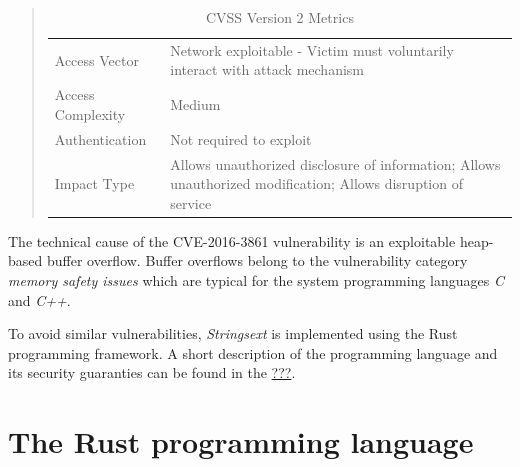 \begin{quote}
\begin{longtable}[]{@{}ll@{}}
\caption{CVSS Version 2 Metrics}\tabularnewline
\toprule
\begin{minipage}[t]{0.31\columnwidth}\raggedright\strut
Access Vector\strut
\end{minipage} & \begin{minipage}[t]{0.63\columnwidth}\raggedright\strut
Network exploitable - Victim must voluntarily interact with attack
mechanism\strut
\end{minipage}\tabularnewline
\begin{minipage}[t]{0.31\columnwidth}\raggedright\strut
Access Complexity\strut
\end{minipage} & \begin{minipage}[t]{0.63\columnwidth}\raggedright\strut
Medium\strut
\end{minipage}\tabularnewline
\begin{minipage}[t]{0.31\columnwidth}\raggedright\strut
Authentication\strut
\end{minipage} & \begin{minipage}[t]{0.63\columnwidth}\raggedright\strut
Not required to exploit\strut
\end{minipage}\tabularnewline
\begin{minipage}[t]{0.31\columnwidth}\raggedright\strut
Impact Type\strut
\end{minipage} & \begin{minipage}[t]{0.63\columnwidth}\raggedright\strut
Allows unauthorized disclosure of information; Allows unauthorized
modification; Allows disruption of service\strut
\end{minipage}\tabularnewline
\bottomrule
\end{longtable}
\end{quote}

The technical cause of the CVE-2016-3861 vulnerability is an exploitable
heap-based buffer overflow. Buffer overflows belong to the vulnerability
category \emph{memory safety issues} which are typical for the system
programming languages \emph{C} and \emph{C++}.

To avoid similar vulnerabilities, \emph{Strings­ext} is implemented
using the Rust programming framework. A short description of the
programming language and its security guaranties can be found in the
\protect\hyperlink{rust}{???}.

\hypertarget{rust}{\section{The Rust programming language}\label{rust}}


